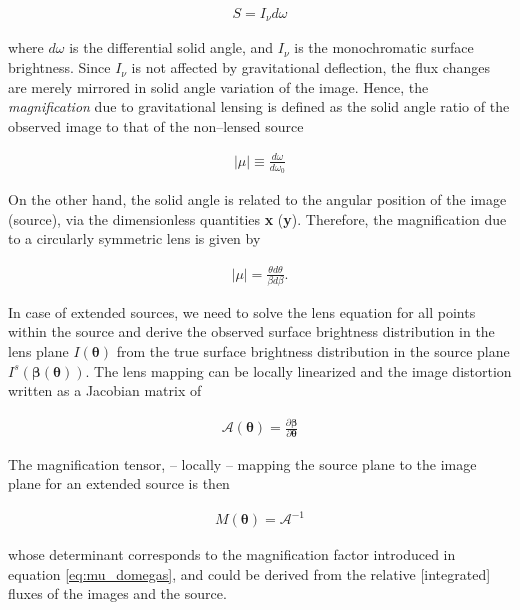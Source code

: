 \documentclass[a4wide,12pt]{book}
\begin{document}
\begin{eqnarray}
\label{eq:flux_to_SB}
S = I_{\nu} d\omega
\end{eqnarray}

where $d\omega$ is the differential solid angle, and $I_{\nu}$ is the monochromatic surface brightness. Since $I_{\nu}$ is not affected by gravitational deflection, the flux changes are merely mirrored in solid angle variation of the image. Hence, the \emph{magnification} due to gravitational lensing is defined as the solid angle ratio of the observed image to that of the non--lensed source

\begin{eqnarray}
\label{eq:mu_domegas}
|\mu| \equiv \frac{d\omega}{d\omega_0}
\end{eqnarray}

On the other hand, the solid angle is related to the angular position of the image (source), via the dimensionless quantities \textbf{x} (\textbf{y}). Therefore, the magnification due to a circularly symmetric lens is given by 

\begin{eqnarray}
\label{eq:mu_beta_theta}
|\mu| = \frac{\theta d\theta}{\beta d\beta}.
\end{eqnarray}

In case of extended sources, we need to solve the lens equation for all points within the source and derive the observed surface brightness distribution in the lens plane $I({\boldsymbol \theta})$ from the true surface brightness distribution in the source plane $I^s({\boldsymbol \beta(\boldsymbol \theta)})$. The lens mapping can be locally linearized and the image distortion written as a Jacobian matrix of 

\begin{eqnarray}
\label{eq:Jacobian}
\mathcal{A}(\boldsymbol \theta) = \frac{\partial \boldsymbol \beta}{\partial \boldsymbol \theta}
\end{eqnarray}

The magnification tensor, -- locally -- mapping the source plane to the image plane for an extended source is then

\begin{eqnarray}
\label{eq:magnification_tensor}
M(\boldsymbol \theta) = \mathcal{A}^{-1}
\end{eqnarray}

whose determinant corresponds to the magnification factor introduced in equation \ref{eq:mu_domegas}, and could be derived from the relative [integrated] fluxes of the images and the source.
\end{document}
